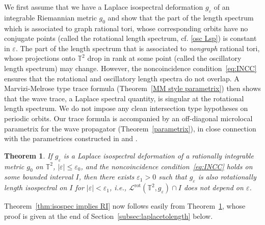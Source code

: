 \documentclass[11pt,letterpaper,oneside]{amsart}
\newcommand{\T}{\mathbb{T}}
\newtheorem{theo}{Theorem}[section]
\theoremstyle{definition}
\theoremstyle{remark}
\newcommand{\eps}{\varepsilon}
\theoremstyle{definition}
\theoremstyle{remark}
\newcommand{\CL}{\mathcal{L}}
\DeclareMathOperator{\rot}{rot}
\begin{document}
\medskip

We first assume that we have a Laplace isospectral deformation $g_\eps$ of an integrable Riemannian metric $g_0$ and show that the part of the length spectrum which is associated to graph rational tori, whose corresponding orbits have no conjugate points (called the rotational length spectrum, cf. \eqref{osc Lsp}) is constant in $\eps$. The part of the length spectrum that is associated to \textit{nongraph} rational tori, whose projections onto $\T^2$ drop in rank at some point (called the oscillatory length spectrum) may change. However, the noncoincidence condition~\eqref{eq:INCC} ensures that the rotational and oscillatory length spectra do not overlap. A Marvizi-Melrose type trace formula (Theorem~\ref{MM style parametrix}) then shows that the wave trace, a Laplace spectral quantity, is singular at the rotational length spectrum. We do not impose any clean intersection type hypotheses on periodic orbits. Our trace formula is accompanied by an off-diagonal microlocal parametrix for the wave propagator (Theorem~\ref{parametrix}), in close connection with the parametrices constructed in \cite{Vig21} and \cite{Vig22}.


\begin{theo} \label{thm:laplacetolength}
    If $g_\eps$ is a Laplace isospectral deformation of a rationally integrable metric $g_0$ on $\T^2$, $|\eps| \leq \eps_0$, and the noncoincidence condition~\eqref{eq:INCC} holds on some bounded interval $I$, then there exists $\eps_1>0$ such that $g_\eps$ is also rotationally length isospectral on $I$ for $|\eps| < \eps_1$, i.e., $\CL^{\rot} (\T^2,g_\eps) \cap I$ does not depend on $\eps$.
\end{theo}




Theorem~\ref{thm:isospec implies RI} now follows easily from Theorem~\ref{thm:laplacetolength}, whose proof is given at the end of Section~\ref{subsec:laplacetolength} below.
\end{document}
